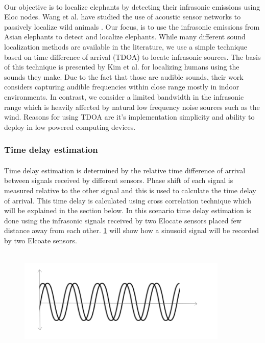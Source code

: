\documentclass[12pt]{article}
\numberwithin{figure}{section}
\numberwithin{table}{section}
\begin{document}
\paragraph{}
Our objective is to localize elephants by detecting their infrasonic emissions using Eloc nodes. Wang et al. have studied the use of acoustic sensor networks to passively localize wild animals \cite{33}. Our focus, is to use the infrasonic emissions from Asian elephants to detect and localize elephants. While many different sound localization methods are available in the literature, we use a simple technique based on time difference of arrival (TDOA) to locate infrasonic sources. The basis of this technique is presented by Kim et al. \cite{34} for localizing humans using the sounds they make. Due to the fact that those are audible sounds, their work considers capturing audible frequencies within close range mostly in indoor environments. In contrast, we consider a limited bandwidth in the infrasonic range which is heavily affected by natural low frequency noise sources such
as the wind. Reasons for using TDOA are it's implementation simplicity and ability to deploy in low powered computing devices. 

\subsubsection{Time delay estimation}
\paragraph{}
Time delay estimation is determined by the relative time difference of arrival between signals received by different sensors. Phase shift of each signal is measured relative to the other signal and this is used to calculate the time delay of arrival. This time delay is calculated using cross correlation technique which will be explained in the section below. In this scenario time delay estimation is done using the infrasonic signals received by  two Elocate sensors placed few distance away from each other. \ref{sinewave} will show how a sinusoid signal will be recorded by two Elcoate sensors. 

\begin{figure}[H]
\centering
\includegraphics[width=100mm,height=50mm]{sinewave.png}
\caption{}
\label{sinewave}
\end{figure}
\end{document}
